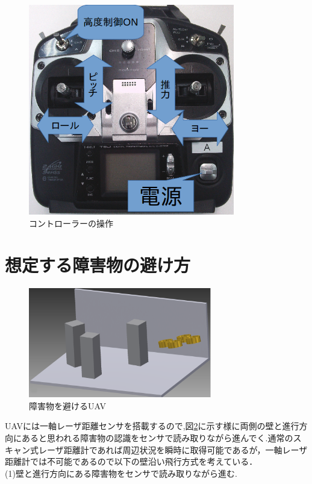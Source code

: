 \documentclass[12pt,oneside]{sotsuken_paper}
\begin{document}
\begin{figure}[H]
\begin{center}
\includegraphics[width=90mm]{img/sousa.png}
\end{center}
\caption{コントローラーの操作}
\label{fig:7}
\end{figure}


\section{想定する障害物の避け方}

\begin{figure}[H]
\begin{center}
\includegraphics[width=80mm]{img/3.png}
\end{center}
\caption{障害物を避けるUAV}
\label{fig:3}
\end{figure}

UAVには一軸レーザ距離センサを搭載するので,図\ref{fig:3}に示す様に両側の壁と進行方向にあると思われる障害物の認識をセンサで読み取りながら進んでく.通常のスキャン式レーザ距離計であれば周辺状況を瞬時に取得可能であるが\cite{suzuki2011}\cite{kumada2010}，一軸レーザ距離計では不可能であるので以下の壁沿い飛行方式を考えている．\\
(1)壁と進行方向にある障害物をセンサで読み取りながら進む.
\end{document}
